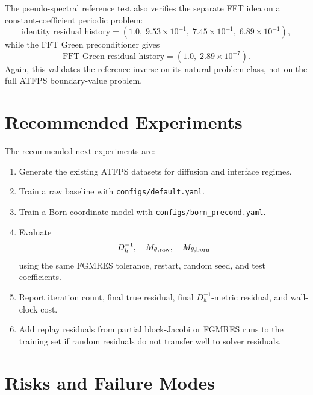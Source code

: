 \documentclass[11pt]{article}
\begin{document}
The pseudo-spectral reference test also verifies the separate FFT idea on a
constant-coefficient periodic problem:
\[
  \text{identity residual history}
  =
  (1.0,\;9.53\times 10^{-1},\;7.45\times 10^{-1},\;6.89\times 10^{-1}),
\]
while the FFT Green preconditioner gives
\[
  \text{FFT Green residual history}
  =
  (1.0,\;2.89\times 10^{-7}).
\]
Again, this validates the reference inverse on its natural problem class, not
on the full ATFPS boundary-value problem.

\section{Recommended Experiments}

The recommended next experiments are:

\begin{enumerate}[leftmargin=2em]
  \item Generate the existing ATFPS datasets for diffusion and interface
  regimes.

  \item Train a raw baseline with \texttt{configs/default.yaml}.

  \item Train a Born-coordinate model with \texttt{configs/born\_precond.yaml}.

  \item Evaluate
  \[
    D_h^{-1},\quad M_{\theta,{\rm raw}},\quad M_{\theta,{\rm born}}
  \]
  using the same FGMRES tolerance, restart, random seed, and test coefficients.

  \item Report iteration count, final true residual, final \(D_h^{-1}\)-metric
  residual, and wall-clock cost.

  \item Add replay residuals from partial block-Jacobi or FGMRES runs to the
  training set if random residuals do not transfer well to solver residuals.
\end{enumerate}

\section{Risks and Failure Modes}
\end{document}
